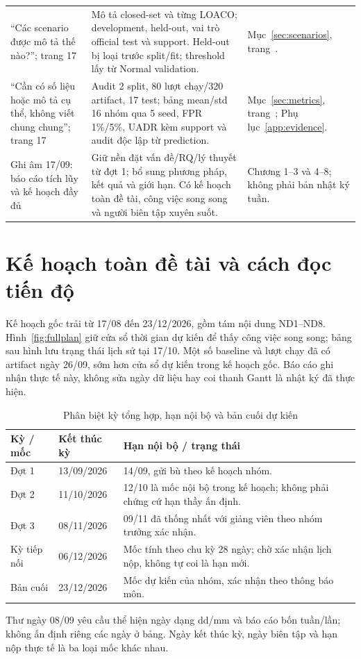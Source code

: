 \documentclass[12pt,a4paper,oneside]{report}
\begin{document}
\begin{longtable}{L{3.4cm}L{8.2cm}L{4.1cm}}
``Các scenario được mô tả thế nào?''; trang 17 & Mô tả closed-set và từng LOACO; development, held-out, vai trò official test và support. Held-out bị loại trước split/fit; threshold lấy từ Normal validation. & Mục~\ref{sec:scenarios}, trang~\pageref{sec:scenarios}.\\
``Cần có số liệu hoặc mô tả cụ thể, không viết chung chung''; trang 17 & Audit 2 split, 80 lượt chạy/320 artifact, 17 test; bảng mean/std 16 nhóm qua 5 seed, FPR 1\%/5\%, UADR kèm support và audit độc lập từ prediction. & Mục~\ref{sec:metrics}, trang~\pageref{sec:metrics}; Phụ lục~\ref{app:evidence}.\\
Ghi âm 17/09: báo cáo tích lũy và kế hoạch đầy đủ & Giữ nền đặt vấn đề/RQ/lý thuyết từ đợt 1; bổ sung phương pháp, kết quả và giới hạn. Có kế hoạch toàn đề tài, công việc song song và người biên tập xuyên suốt. & Chương 1--3 và 4--8; không phải bản nhật ký tuần.\\
\bottomrule\end{longtable}\endgroup

\section{Kế hoạch toàn đề tài và cách đọc tiến độ}\label{sec:progress}
Kế hoạch gốc trải từ 17/08 đến 23/12/2026, gồm tám nội dung ND1--ND8. Hình~\ref{fig:fullplan} giữ cửa sổ thời gian dự kiến để thấy công việc song song; bảng sau hình lưu trạng thái lịch sử tại 17/10. Một số baseline và lượt chạy đã có artifact ngày 26/09, sớm hơn cửa sổ dự kiến trong kế hoạch gốc. Báo cáo ghi nhận thực tế này, không sửa ngày dữ liệu hay coi thanh Gantt là nhật ký đã thực hiện.



\begin{table}[H]\centering\small
\caption{Phân biệt kỳ tổng hợp, hạn nội bộ và bản cuối dự kiến}
\begin{tabularx}{\textwidth}{L{2.0cm}L{3.8cm}Y}\toprule
Kỳ / mốc & Kết thúc kỳ & Hạn nội bộ / trạng thái\\\midrule
Đợt 1 & 13/09/2026 & 14/09, gửi bù theo kế hoạch nhóm.\\
Đợt 2 & 11/10/2026 & 12/10 là mốc nội bộ trong kế hoạch; không phải chứng cứ hạn thầy ấn định.\\
Đợt 3 & 08/11/2026 & 09/11 đã thống nhất với giảng viên theo nhóm trưởng xác nhận.\\
Kỳ tiếp nối & 06/12/2026 & Mốc tính theo chu kỳ 28 ngày; chờ xác nhận lịch nộp, không tự coi là hạn mới.\\
Bản cuối & 23/12/2026 & Mốc dự kiến của nhóm, xác nhận theo thông báo môn.\\
\bottomrule\end{tabularx}\end{table}
Thư ngày 08/09 yêu cầu thể hiện ngày dạng dd/mm và báo cáo bốn tuần/lần; không ấn định riêng các ngày ở bảng. Ngày kết thúc kỳ, ngày biên tập và hạn nộp thực tế là ba loại mốc khác nhau.
\end{document}
